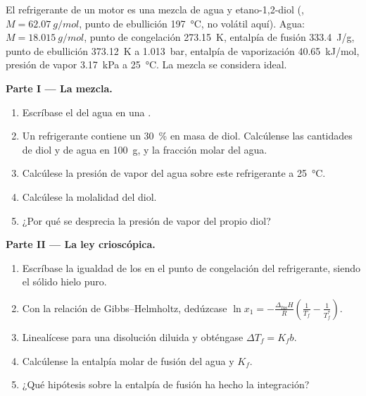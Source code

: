 \begin{problem}
\label{pb:b2:chemical-potential:1}
El refrigerante de un motor es una mezcla de agua y etano-1,2-diol
(, $M = \qty{62.07}{g/mol}$, punto de ebullición \qty{197}{\celsius},
no volátil aquí). Agua: $M = \qty{18.015}{g/mol}$, punto de congelación
\qty{273.15}{K}, entalpía de fusión \qty{333.4}{J/g}, punto de ebullición
\qty{373.12}{K} a \qty{1.013}{bar}, entalpía de vaporización
\qty{40.65}{kJ/mol}, presión de vapor \qty{3.17}{kPa} a \qty{25}{\celsius}.
La mezcla se considera ideal.

\medskip
\noindent\textbf{Parte I --- La mezcla.}
\begin{enumerate}
  \item Escríbase el  del agua en una .
  \item Un refrigerante contiene un \qty{30}{\percent} en masa de diol. Calcúlense las
        cantidades de diol y de agua en \qty{100}{g}, y la fracción molar del
        agua.
  \item Calcúlese la presión de vapor del agua sobre este refrigerante a
        \qty{25}{\celsius}.
  \item Calcúlese la molalidad del diol.
  \item ¿Por qué se desprecia la presión de vapor del propio diol?
\end{enumerate}

\medskip
\noindent\textbf{Parte II --- La ley crioscópica.}
\begin{enumerate}[resume]
  \item Escríbase la igualdad de los  en el punto de congelación del
        refrigerante, siendo el sólido hielo puro.
  \item Con la relación de Gibbs--Helmholtz, dedúzcase $\ln x_1 =
        -\frac{\Delta_{\text{fus}}H}{R}\left(\frac1{T_f} - \frac1{T_f^*}\right)$.
  \item Linealícese para una disolución diluida y obténgase $\Delta T_f = K_f b$.
  \item Calcúlense la entalpía molar de fusión del agua y $K_f$.
  \item ¿Qué hipótesis sobre la entalpía de fusión ha hecho la integración?
\end{enumerate}


\end{problem}
